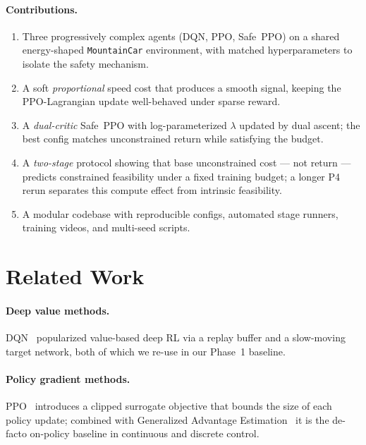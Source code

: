 \documentclass{article}
\begin{document}
\paragraph{Contributions.}
\begin{enumerate}
    \item Three progressively complex agents (DQN, PPO, Safe~PPO) on a shared energy-shaped \texttt{MountainCar} environment, with matched hyperparameters to isolate the safety mechanism.
    \item A soft \emph{proportional} speed cost that produces a smooth signal, keeping the PPO-Lagrangian update well-behaved under sparse reward.
    \item A \emph{dual-critic} Safe~PPO with log-parameterized $\lambda$ updated by dual ascent; the best config matches unconstrained return while satisfying the budget.
    \item A \emph{two-stage} protocol showing that base unconstrained cost --- not return --- predicts constrained feasibility under a fixed training budget; a longer P4 rerun separates this compute effect from intrinsic feasibility.
    \item A modular codebase with reproducible configs, automated stage runners, training videos, and multi-seed scripts.
\end{enumerate}


\section{Related Work}
\label{sec:related}

\paragraph{Deep value methods.} DQN~\citep{mnih2015dqn} popularized value-based deep RL via a
replay buffer and a slow-moving target network, both of which we re-use in our Phase~1 baseline.

\paragraph{Policy gradient methods.} PPO~\citep{schulman2017ppo} introduces a clipped surrogate
objective that bounds the size of each policy update; combined with Generalized Advantage
Estimation~\citep{schulman2016gae} it is the de-facto on-policy baseline in continuous and
discrete control.
\end{document}
